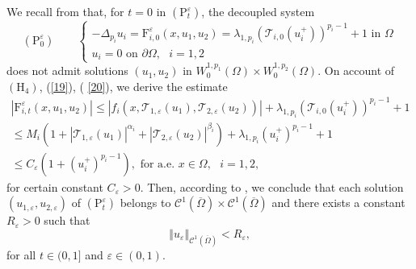 \documentclass[11pt]{amsart}
\theoremstyle{definition}
\theoremstyle{remark}
\numberwithin{equation}{section}
\begin{document}
We recall from \cite[Proposition 9.64]{MMP2} that, for $t=0$ in $(\mathrm{P}%
_{t}^{\varepsilon })$, the decoupled system%
\begin{equation*}
(\mathrm{P}_{0}^{\varepsilon })\qquad \left\{ 
\begin{array}{l}
-\Delta _{p_{i}}u_{i}=\mathrm{F}_{i,0}^{\varepsilon }({x,}%
u_{1},u_{2})=\lambda _{1,p_{i}}(\mathcal{T}_{i,0}(u_{i}^{+}))^{p_{i}-1}+1%
\text{ in }\Omega \\ 
u_{i}=0\text{ \ on }\partial \Omega ,\text{ }i=1,2%
\end{array}%
\right.
\end{equation*}%
does not admit solutions $(u_{1},u_{2})$ in $W_{0}^{1,p_{1}}(\Omega )\times
W_{0}^{1,p_{2}}(\Omega )$. On account of $(\mathrm{H}_{4})$, (\ref{19}), (%
\ref{20}), we derive the estimate%
\begin{equation*}
\begin{array}{l}
|\mathrm{F}_{i,t}^{\varepsilon }({x,}u_{1},u_{2})|\leq |f_{i}(x,\mathcal{T}%
_{1,\varepsilon }(u_{1}),\mathcal{T}_{2,\varepsilon }(u_{2}))|+\lambda
_{1,p_{i}}(\mathcal{T}_{i,0}(u_{i}^{+}))^{p_{i}-1}+1 \\ 
\leq M_{i}(1+|\mathcal{T}_{1,\varepsilon }(u_{1})|^{\alpha _{i}}+|\mathcal{T}%
_{2,\varepsilon }(u_{2})|^{\beta _{i}})+\lambda
_{1,p_{i}}(u_{i}^{+})^{p_{i}-1}+1 \\ 
\leq C_{\varepsilon }(1+(u_{i}^{+})^{p_{i}-1}),\text{ for a.e. }x\in \Omega ,%
\text{ }i=1,2,%
\end{array}%
\end{equation*}%
for certain constant $C_{\varepsilon }>0$. Then, according to \cite[%
Corollary 8.13]{MMP2}, we conclude that each solution $(u_{1,\varepsilon
},u_{2,\varepsilon })$ of $(\mathrm{P}_{t}^{\varepsilon })$ belongs to $%
\mathcal{C}^{1}(\overline{\Omega })\times \mathcal{C}^{1}(\overline{\Omega }%
) $ and there exists a constant $R_{\varepsilon }>0$ such that 
\begin{equation}
\left\Vert u_{\varepsilon }\right\Vert _{\mathcal{C}^{1}(\overline{\Omega }%
)}<R_{\varepsilon },  \label{21}
\end{equation}%
for all $t\in (0,1]$ and $\varepsilon \in (0,1)$.
\end{document}
